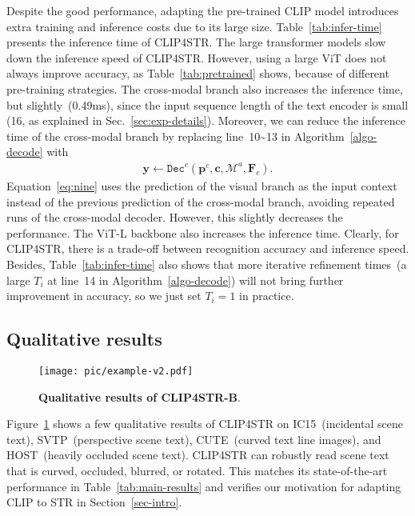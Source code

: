 \documentclass[lettersize,journal]{IEEEtran}
\begin{document}
Despite the good performance, adapting the pre-trained CLIP model introduces extra training and inference costs due to its large size.
Table~\ref{tab:infer-time} presents the inference time of CLIP4STR.
The large transformer models slow down the inference speed of CLIP4STR. However, using a large ViT does not always improve accuracy, as Table~\ref{tab:pretrained} shows, because of different pre-training strategies. 
The cross-modal branch also increases the inference time, but slightly~(0.49ms), since the input sequence length of the text encoder is small (16, as explained in Sec.~\ref{sec:exp-details}).
Moreover, we can reduce the inference time of the cross-modal branch by replacing line~10\textasciitilde13 in Algorithm~\ref{algo-decode} with
\begin{align} \label{eq:nine}
    \bm{y} \leftarrow \texttt{Dec}^c(\bm{p}^c, \bm{c}, \mathcal{M}^a, \bm{F}_c).
\end{align}
Equation~\eqref{eq:nine} uses the prediction of the visual branch as the input context instead of the previous prediction of the cross-modal branch, avoiding repeated runs of the cross-modal decoder. However, this slightly decreases the performance.
The ViT-L backbone also increases the inference time.
Clearly, for CLIP4STR, there is a trade-off between recognition accuracy and inference speed. Besides, Table~\ref{tab:infer-time} also shows that more iterative refinement times~(a large $T_i$ at line~14 in Algorithm~\ref{algo-decode}) will not bring further improvement in accuracy, so we just set $T_i=1$ in practice.



\subsection{Qualitative results} \label{sec:qualitative}
\begin{figure}[t]
	\centering
	\texttt{[image: pic/example-v2.pdf]}
	\caption{\textbf{Qualitative results of CLIP4STR-B}.}
	\label{fig:qualitative}
\end{figure}
Figure~\ref{fig:qualitative} shows a few qualitative results of CLIP4STR on IC15~(incidental scene text), SVTP~(perspective scene text), CUTE~(curved text line images), and HOST~(heavily occluded scene text).
CLIP4STR can robustly read scene text that is curved, occluded, blurred, or rotated.
This matches its state-of-the-art performance in Table~\ref{tab:main-results} and verifies our motivation for adapting CLIP to STR in Section~\ref{sec-intro}.
\end{document}
